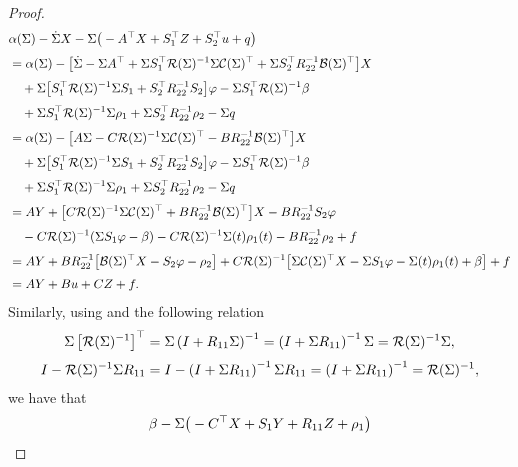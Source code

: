 \documentclass[11pt,times,twoside]{article}
\begin{document}
\begin{proof}
%
$$
\begin{aligned}
\ds & \alpha(\Si)- \dot{\Si} X-\Si\big(-A^{\top} X+S_{1}^{\top} Z+S_{2}^{\top} u +q \big) \\
%
\ns\ds &= \alpha(\Si)-\big[\dot{\Si}-\Si A^{\top}+\Si S_{1}^{\top} \mathcal{R}(\Si)^{-1} \Si \mathcal{C}(\Si)^{\top}+\Si S_{2}^{\top} R_{22}^{-1} \mathcal{B}(\Si)^{\top}\big] X \\
%
\ns\ds &\q +\Si \big[S_{1}^{\top} \mathcal{R}(\Si)^{-1} \Si S_{1}+S_{2}^{\top}
 R_{22}^{-1} S_{2}\big] \varphi-\Si S_{1}^{\top} \mathcal{R}(\Si)^{-1}\beta\\
%
\ns\ds &\q +\Si S_{1}^{\top} \mathcal{R}(\Si)^{-1} \Si\rho_1
+\Si S_{2}^{\top} R_{22}^{-1}\rho_2-\Si q \\
%
\ns\ds &= \alpha(\Si)-\big[A \Si-C \mathcal{R}(\Si)^{-1} \Si \mathcal{C}(\Si)^{\top}-B R_{22}^{-1} \mathcal{B}(\Si)^{\top}\big] X \\
%
\ns\ds &\q +\Si\big[S_{1}^{\top} \mathcal{R}(\Si)^{-1} \Si S_{1}+S_{2}^{\top} R_{22}^{-1} S_{2}\big] \varphi-\Si S_{1}^{\top} \mathcal{R}(\Si)^{-1} \beta\\
%
\ns\ds &\q +\Si S_{1}^{\top} \mathcal{R}(\Si)^{-1} \Si\rho_1
+\Si S_{2}^{\top} R_{22}^{-1}\rho_2-\Si q \\
%
\ns\ds &= A Y+\big[C \mathcal{R}(\Si)^{-1} \Si \mathcal{C}(\Si)^{\top}+B R_{22}^{-1} \mathcal{B}(\Si)^{\top}\big] X-B R_{22}^{-1} S_{2} \varphi \\
%
\ns\ds &\q -C \mathcal{R}(\Si)^{-1}(\Si S_{1} \varphi-\beta)
  -C \mathcal{R}(\Si)^{-1}\Si(t)\rho_1(t)
  -BR_{22}^{-1}\rho_2 +f \\
%
\ns\ds & = A Y+B R_{22}^{-1}\big[\mathcal{B}(\Si)^{\top} X-S_{2} \varphi -\rho_2\big]+
C \mathcal{R}(\Si)^{-1}\big[\Si \mathcal{C}(\Si)^{\top} X-\Si S_{1} \varphi
-\Si(t)\rho_1(t)
+\beta\big]
+f \\
%
\ns\ds &= A Y+B u+C Z +f.
%
\end{aligned}
$$
%
Similarly, using  and the following relation
%
\begin{align*}
\ds \Si\left[\mathcal{R}(\Si)^{-1}\right]^{\top} &=\Si\left(I+R_{11} \Si\right)^{-1}=\left(I+\Si R_{11}\right)^{-1} \Si=\mathcal{R}(\Si)^{-1} \Si, \\
\ns\ds I-\mathcal{R}(\Si)^{-1} \Si R_{11} &=I-\left(I+\Si R_{11}\right)^{-1} \Si R_{11}=\left(I+\Si R_{11}\right)^{-1}=\mathcal{R}(\Si)^{-1},
\end{align*}
%
we have that
%
\begin{align*}
\ds & \beta-\Si \big(-C^{\top} X+S_{1} Y+R_{11} Z +\rho_1\big) \\

\end{align*}
\end{proof}
\end{document}
